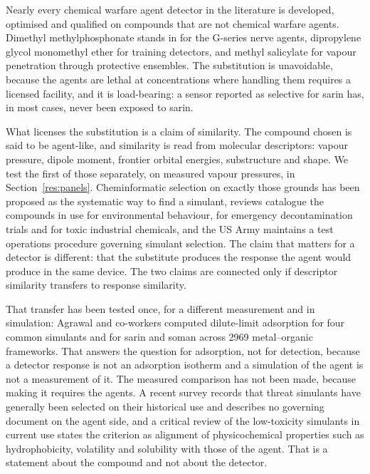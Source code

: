 \documentclass[journal=jacsat,manuscript=article,margin=1in]{achemso}
\begin{document}
Nearly every chemical warfare agent detector in the literature is developed,
optimised and qualified on compounds that are not chemical warfare
agents.\cite{askim2013,rakow2000} Dimethyl methylphosphonate stands in for
the G-series nerve agents,\cite{niosh2002simulant} dipropylene glycol
monomethyl ether for training detectors,\cite{seitzinger2006simulant} and
methyl salicylate for vapour penetration through protective
ensembles.\cite{nrc1997mist,astmf2588} The substitution is unavoidable,
because the agents are lethal at concentrations where handling them requires
a licensed facility, and it is load-bearing: a sensor reported as selective
for sarin has, in most cases, never been exposed to sarin.

What licenses the substitution is a claim of similarity. The compound chosen
is said to be agent-like, and similarity is read from molecular descriptors:
vapour pressure, dipole moment, frontier orbital energies, substructure and
shape. We test the first of those separately, on measured vapour pressures,
in Section~\ref{res:panels}. Cheminformatic selection on exactly those grounds
has been proposed as the systematic way to find a
simulant,\cite{lavoie2011} reviews catalogue the compounds in use for
environmental behaviour,\cite{bartelthunt2008} for emergency decontamination
trials\cite{james2018} and for toxic industrial chemicals,\cite{james2021}
and the US Army maintains a test operations procedure governing simulant
selection.\cite{top082196} The claim that matters for a detector is different:
that the substitute produces the response the agent would produce in the same
device. The two claims are connected only if descriptor similarity transfers
to response similarity.

That transfer has been tested once, for a different measurement and in
simulation: Agrawal and co-workers computed dilute-limit adsorption for four
common simulants and for sarin and soman across 2969 metal--organic
frameworks.\cite{agrawal2018} That answers the question for adsorption, not
for detection, because a detector response is not an adsorption isotherm and a
simulation of the agent is not a measurement of it. The measured comparison has
not been made, because making it requires the agents. A recent survey records
that threat simulants have generally been selected on their historical use and
describes no governing document on the agent side,\cite{lawrence2025simulants}
and a critical review of the low-toxicity simulants in current use states the
criterion as alignment of physicochemical properties such as hydrophobicity,
volatility and solubility with those of the agent.\cite{webb2025} That is a
statement about the compound and not about the detector.
\end{document}
